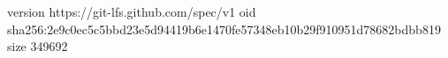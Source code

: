 version https://git-lfs.github.com/spec/v1
oid sha256:2e9c0ec5c5bbd23e5d94419b6e1470fe57348eb10b29f910951d78682bdbb819
size 349692
